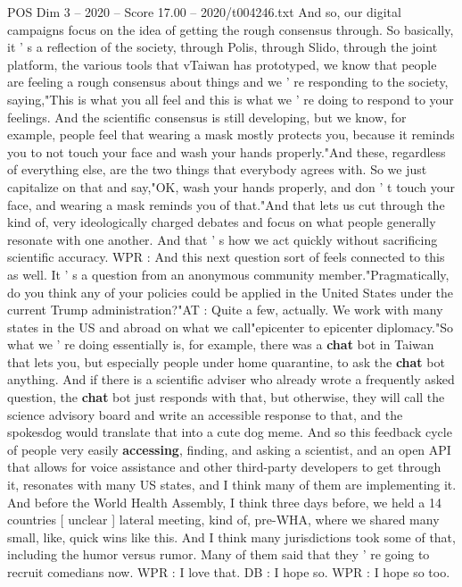 \begin{textsample}{POS Dim 3 – 2020 – Score 17.00 – 2020/t004246.txt}
And so, our digital campaigns focus on the idea of getting the rough consensus through.
So basically, it ' s a reflection of the society, through Polis, through Slido, through the joint platform, the various tools that vTaiwan has prototyped, we know that people are feeling a rough consensus about things and we ' re responding to the society, saying,"This is what you all feel and this is what we ' re doing to respond to your feelings.
And the scientific consensus is still developing, but we know, for example, people feel that wearing a mask mostly protects you, because it reminds you to not touch your face and wash your hands properly."And these, regardless of everything else, are the two things that everybody agrees with.
So we just capitalize on that and say,"OK, wash your hands properly, and don ' t touch your face, and wearing a mask reminds you of that."And that lets us cut through the kind of, very ideologically charged debates and focus on what people generally resonate with one another.
And that ' s how we act quickly without sacrificing scientific accuracy.
WPR : And this next question sort of feels connected to this as well.
It ' s a question from an anonymous community member."Pragmatically, do you think any of your policies could be applied in the United States under the current Trump administration?"AT : Quite a few, actually.
We work with many states in the US and abroad on what we call"epicenter to epicenter diplomacy."So what we ' re doing essentially is, for example, there was a \textbf{chat} bot in Taiwan that lets you, but especially people under home quarantine, to ask the \textbf{chat} bot anything.
And if there is a scientific adviser who already wrote a frequently asked question, the \textbf{chat} bot just responds with that, but otherwise, they will call the science advisory board and write an accessible response to that, and the spokesdog would translate that into a cute dog meme.
And so this feedback cycle of people very easily \textbf{accessing}, finding, and asking a scientist, and an open API that allows for voice assistance and other third-party developers to get through it, resonates with many US states, and I think many of them are implementing it.
And before the World Health Assembly, I think three days before, we held a 14 countries [ unclear ] lateral meeting, kind of, pre-WHA, where we shared many small, like, quick wins like this.
And I think many jurisdictions took some of that, including the humor versus rumor.
Many of them said that they ' re going to recruit comedians now.
WPR : I love that.
DB : I hope so.
WPR : I hope so too.

\end{textsample}
